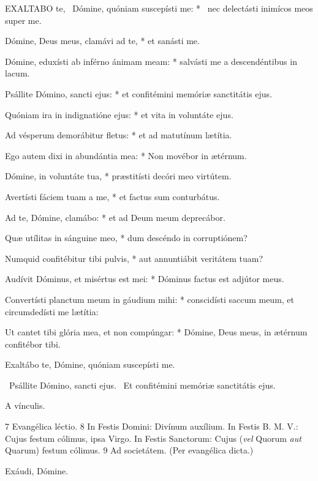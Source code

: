 \lettrine[lines=2]{E}{XALTABO} te, \textdagger\ Dómine, quóniam suscepísti me: * \textdaggerdbl\ nec delectásti inimícos meos super me.

Dómine, Deus meus, clamávi ad te, * et sanásti me.

Dómine, eduxísti ab inférno ánimam meam: * salvásti me a descendéntibus in lacum.

Psállite Dómino, sancti ejus: * et confitémini memóriæ sanctitátis ejus.

Quóniam ira in indignatióne ejus: * et vita in voluntáte ejus.

Ad vésperum demorábitur fletus: * et ad matutínum lætítia.

Ego autem dixi in abundántia mea: * Non movébor in ætérnum.

Dómine, in voluntáte tua, * præstitísti decóri meo virtútem.

Avertísti fáciem tuam a me, * et factus sum conturbátus.

Ad te, Dómine, clamábo: * et ad Deum meum deprecábor.

Quæ utílitas in sánguine meo, * dum descéndo in corruptiónem?

Numquid confitébitur tibi pulvis, * aut annuntiábit veritátem tuam?

Audívit Dóminus, et misértus est mei: * Dóminus factus est adjútor meus.

Convertísti planctum meum in gáudium mihi: * conscidísti saccum meum, et circumdedísti me lætítia:

Ut cantet tibi glória mea, et non compúngar: * Dómine, Deus meus, in ætérnum confitébor tibi.

 Exaltábo te, Dómine, quóniam suscepísti me.


\V\ Psállite Dómino, sancti ejus. \R\ Et confitémini memóriæ sanctitátis ejus.


 A vínculis.

 7 Evangélica léctio. 8 In Festis Domini: Divínum auxílium. In Festis B. M. V.: Cujus festum cólimus, ipsa Virgo. In Festis Sanctorum: Cujus (\textit{vel} Quorum \textit{aut} Quarum) festum cólimus. 9 Ad societátem. (Per evangélica dicta.)


 Exáudi, Dómine.

